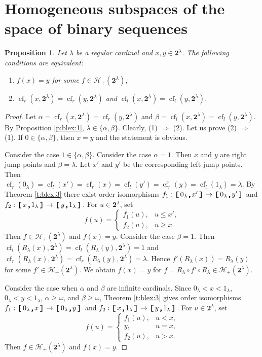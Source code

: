 \documentclass[preprint]{elsarticle}
\def\om{\omega}
\def\be{\beta}
\def\al{\alpha}
\def\la{\lambda}
\def\cH{\mathcal{H}}
\def\sset#1{\{#1\}}
\newtheorem{proposition}{Proposition}[section]
\theoremstyle{definition}
\theoremstyle{remark}
\def\rarr{\Rightarrow}
\def\cf{\operatorname{cf}}
\def\lex#1#2{\mathfrak{L}(#2^{#1})}
\def\lex#1#2{#2^{#1}}
\def\B{2}
\def\B{\mathsf{2}}
\def\B{\mathbf{2}}
\def\ilcomma/{\boldsymbol{,}}
\def\ilsymlc{\boldsymbol{[}}
\def\ilsymrc{\boldsymbol{]}}
\def\ilfont#1{\boldsymbol{#1}}
\def\ilfontX#1{\mathrm{\text{\texttt{\textbf{\large #1}}}}}
\def\ilfontX#1{{\text{\texttt{\textbf{\large \upshape #1}}}}}
\def\ilfont#1{\raisebox{-1.2pt}{\ilfontX{#1}}}
\def\ilfontC#1{\raisebox{-0.7pt}{\ilfontX{#1}}}
\def\ilcomma/{\ilfontC{,}}
\def\ilsymlc{\ilfont{[}\,}
\def\ilsymrc{\,\ilfont{]}}
\def\ilcc[#1,#2]{\ilsymlc#1\ilcomma/ #2\ilsymrc}
\def\lexab{\lex\la\B}
\def\oip#1{\cH_{+}(#1)}
\begin{document}
\section{Homogeneous subspaces of the space of binary sequences} \label{sec:blexhome}
\begin{proposition}\label{p:blexhome:1-1}
Let $\la$ be a regular cardinal and $x,y\in \lexab$.
The following conditions are equivalent:
\begin{enumerate}
\item
$f(x)=y$ for some $f\in\oip\lexab$;
\item
$\cf_r(x,\lexab)=\cf_r(y,\lexab)$ and
$\cf_l(x,\lexab)=\cf_l(y,\lexab)$.
\end{enumerate}
\end{proposition}
\begin{proof}
Let 
$\al=\cf_r(x,\lexab)=\cf_r(y,\lexab)$ and
$\be = \cf_l(x,\lexab)=\cf_l(y,\lexab)$.
By Proposition \ref{p:blex:1}, $\la\in\sset{\al,\be}$.
Clearly, (1) $\rarr$ (2). Let us prove (2) $\rarr$ (1).
If $0\in\sset{\al,\be}$, then $x=y$ and the statement is obvious.

Consider the case $1\in\sset{\al,\be}$. Consider the case $\al=1$. Then $x$ and $y$ are right jump points and $\be=\la$. Let $x'$ and $y'$ be the corresponding left jump points. Then $\cf_r(0_\la)=\cf_l(x')=\cf_r(x)=\cf_l(y')=\cf_r(y)=\cf_l(1_\la)=\la$. By Theorem \ref{t:blex:3} there exist order isomorphisms $f_1: \ilcc[0_\la,x']\to \ilcc[0_\la,y']$ and $f_2: \ilcc[x,1_\la]\to \ilcc[y,1_\la]$. For $u\in \lexab$, set
\[
f(u)=\begin{cases}
f_1(u), & u \leq x',
\\
f_2(u), & u \geq x.
\end{cases}
\]
Then $f\in\oip{\lexab}$ and $f(x)=y$.
Consider the case $\be=1$. Then $\cf_l(R_\la(x),\lexab)=\cf_l(R_\la(y),\lexab)=1$ and $\cf_r(R_\la(x),\lexab)=\cf_r(R_\la(y),\lexab)=\la$. Hence $f'(R_\la(x))=R_\la(y)$ for some $f'\in \oip{\lexab}$. We obtain $f(x)=y$ for $f=R_\la\circ f' \circ R_\la\in \oip\lexab$.

Consider the case when $\al$ and $\be$ are infinite cardinals.
Since $0_\la<x<1_\la$, $0_\la<y<1_\la$, $\al\geq \om$, and $\be\geq \om$, Theorem \ref{t:blex:3} gives order isomorphisms $f_1: \ilcc[0_\la,x]\to \ilcc[0_\la,y]$ and $f_2: \ilcc[x,1_\la]\to \ilcc[y,1_\la]$. For $u\in \lexab$, set
\[
f(u)=\begin{cases}
f_1(u), & u < x,
\\
y, & u=x,
\\
f_2(u), & u > x.
\end{cases}
\]
Then $f\in\oip{\lexab}$ and $f(x)=y$.
\end{proof}
\end{document}
